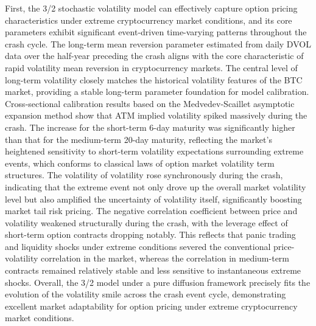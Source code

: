 First, the 3/2 stochastic volatility model can effectively capture option pricing characteristics under extreme cryptocurrency market conditions, and its core parameters exhibit significant event-driven time-varying patterns throughout the crash cycle. The long-term mean reversion parameter estimated from daily DVOL data over the half-year preceding the crash aligns with the core characteristic of rapid volatility mean reversion in cryptocurrency markets. The central level of long-term volatility closely matches the historical volatility features of the BTC market, providing a stable long-term parameter foundation for model calibration. Cross-sectional calibration results based on the Medvedev-Scaillet asymptotic expansion method show that ATM implied volatility spiked massively during the crash. The increase for the short-term 6-day maturity was significantly higher than that for the medium-term 20-day maturity, reflecting the market's heightened sensitivity to short-term volatility expectations surrounding extreme events, which conforms to classical laws of option market volatility term structures. The volatility of volatility rose synchronously during the crash, indicating that the extreme event not only drove up the overall market volatility level but also amplified the uncertainty of volatility itself, significantly boosting market tail risk pricing. The negative correlation coefficient between price and volatility weakened structurally during the crash, with the leverage effect of short-term option contracts dropping notably. This reflects that panic trading and liquidity shocks under extreme conditions severed the conventional price-volatility correlation in the market, whereas the correlation in medium-term contracts remained relatively stable and less sensitive to instantaneous extreme shocks. Overall, the 3/2 model under a pure diffusion framework precisely fits the evolution of the volatility smile across the crash event cycle, demonstrating excellent market adaptability for option pricing under extreme cryptocurrency market conditions.

